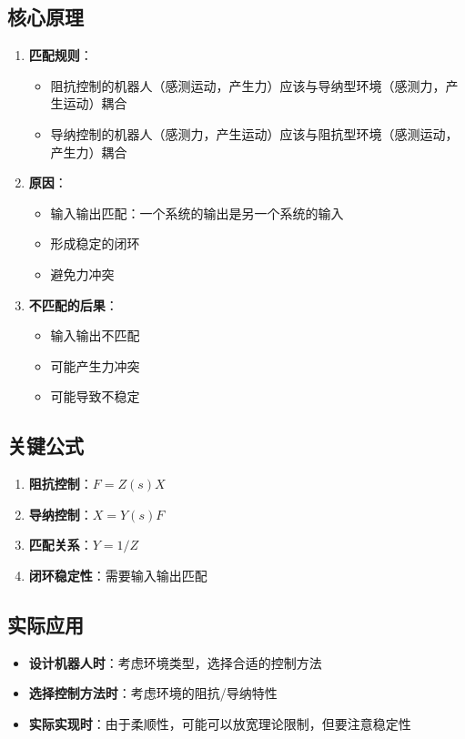 \documentclass[12pt,a4paper]{article}
\begin{document}
\subsection{核心原理}

\begin{enumerate}
\item \textbf{匹配规则}：
\begin{itemize}
\item 阻抗控制的机器人（感测运动，产生力）应该与导纳型环境（感测力，产生运动）耦合
\item 导纳控制的机器人（感测力，产生运动）应该与阻抗型环境（感测运动，产生力）耦合
\end{itemize}

\item \textbf{原因}：
\begin{itemize}
\item 输入输出匹配：一个系统的输出是另一个系统的输入
\item 形成稳定的闭环
\item 避免力冲突
\end{itemize}

\item \textbf{不匹配的后果}：
\begin{itemize}
\item 输入输出不匹配
\item 可能产生力冲突
\item 可能导致不稳定
\end{itemize}
\end{enumerate}

\subsection{关键公式}

\begin{enumerate}
\item \textbf{阻抗控制}：$F = Z(s) X$
\item \textbf{导纳控制}：$X = Y(s) F$
\item \textbf{匹配关系}：$Y = 1/Z$
\item \textbf{闭环稳定性}：需要输入输出匹配
\end{enumerate}

\subsection{实际应用}

\begin{itemize}
\item \textbf{设计机器人时}：考虑环境类型，选择合适的控制方法
\item \textbf{选择控制方法时}：考虑环境的阻抗/导纳特性
\item \textbf{实际实现时}：由于柔顺性，可能可以放宽理论限制，但要注意稳定性
\end{itemize}
\end{document}
